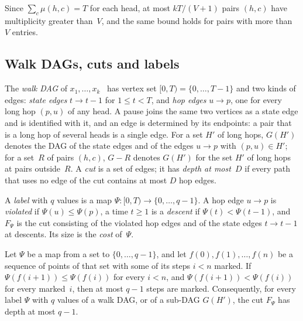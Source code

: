 Since $\sum_c\mu(h,c)=T$ for each head, at most $kT/(V+1)$ pairs $(h,c)$ have multiplicity greater than~$V$, and the
same bound holds for pairs with more than $V$ entries.

\subsection{Walk DAGs, cuts and labels}\label{sec:prelim-dag}

The \emph{walk DAG} of $x_1,\dots,x_k$~\cite[Section~4.4]{FourthPaper2026} has vertex set $[0,T)=\{0,\dots,T-1\}$ and two
kinds of edges: \emph{state edges} $t\to t-1$ for $1\le t<T$, and \emph{hop edges} $u\to p$, one for every long hop
$(p,u)$ of any head. A pause joins the same two vertices as a state edge and is identified with it, and an edge is
determined by its endpoints: a pair that is a long hop of several heads is a single edge. For a set $H'$ of long hops,
$G(H')$ denotes the DAG of the state edges and of the edges $u\to p$ with $(p,u)\in H'$; for a set~$R$ of pairs
$(h,c)$, $G-R$ denotes $G(H')$ for the set $H'$ of long hops at pairs outside~$R$. A \emph{cut} is a set of edges; it has
\emph{depth at most~$D$} if every path that uses no edge of the cut contains at most $D$ hop edges.

A \emph{label} with $q$ values is a map $\Psi\colon[0,T)\to\{0,\dots,q-1\}$. A hop edge $u\to p$ is \emph{violated} if
$\Psi(u)\le\Psi(p)$, a time $t\ge1$ is a \emph{descent} if $\Psi(t)<\Psi(t-1)$, and $F_\Psi$ is the cut consisting of
the violated hop edges and of the state edges $t\to t-1$ at descents. Its size is the \emph{cost} of~$\Psi$.

\begin{lemma}\label{lem:labels}
Let $\Psi$ be a map from a set to $\{0,\dots,q-1\}$, and let $f(0),f(1),\dots,f(n)$ be a sequence of points of that set
with some of its steps $i<n$ marked. If $\Psi(f(i+1))\le\Psi(f(i))$ for every $i<n$, and $\Psi(f(i+1))<\Psi(f(i))$ for
every marked~$i$, then at most $q-1$ steps are marked. Consequently, for every label $\Psi$ with $q$ values of a
walk DAG, or of a sub-DAG $G(H')$, the cut $F_\Psi$ has depth at most $q-1$.
\end{lemma}

